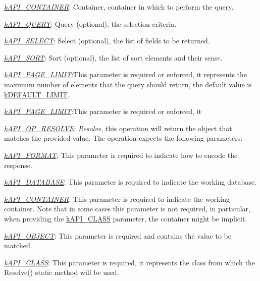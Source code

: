 \begin{DoxyItemize}
\begin{DoxyItemize}
\begin{DoxyItemize}
\item {\itshape \hyperlink{}{k\-A\-P\-I\-\_\-\-C\-O\-N\-T\-A\-I\-N\-E\-R}}\-: Container, container in which to perform the query. 
\item {\itshape \hyperlink{}{k\-A\-P\-I\-\_\-\-Q\-U\-E\-R\-Y}}\-: Query (optional), the selection criteria. 
\item {\itshape \hyperlink{}{k\-A\-P\-I\-\_\-\-S\-E\-L\-E\-C\-T}}\-: Select (optional), the list of fields to be returned. 
\item {\itshape \hyperlink{}{k\-A\-P\-I\-\_\-\-S\-O\-R\-T}}\-: Sort (optional), the list of sort elements and their sense. 
\item {\itshape \hyperlink{}{k\-A\-P\-I\-\_\-\-P\-A\-G\-E\-\_\-\-L\-I\-M\-I\-T}}\-:This parameter is required or enforced, it represents the maximum number of elements that the query should return, the default value is \hyperlink{}{k\-D\-E\-F\-A\-U\-L\-T\-\_\-\-L\-I\-M\-I\-T}. 
\item {\itshape \hyperlink{}{k\-A\-P\-I\-\_\-\-P\-A\-G\-E\-\_\-\-L\-I\-M\-I\-T}}\-:This parameter is required or enforced, it 
\end{DoxyItemize}
\item {\itshape \hyperlink{}{k\-A\-P\-I\-\_\-\-O\-P\-\_\-\-R\-E\-S\-O\-L\-V\-E}}\-: {\itshape Resolve}, this operation will return the object that matches the provided value. The operation expects the following parameters\-: 
\begin{DoxyItemize}
\item {\itshape \hyperlink{}{k\-A\-P\-I\-\_\-\-F\-O\-R\-M\-A\-T}}\-: This parameter is required to indicate how to encode the response. 
\item {\itshape \hyperlink{}{k\-A\-P\-I\-\_\-\-D\-A\-T\-A\-B\-A\-S\-E}}\-: This parameter is required to indicate the working database. 
\item {\itshape \hyperlink{}{k\-A\-P\-I\-\_\-\-C\-O\-N\-T\-A\-I\-N\-E\-R}}\-: This parameter is required to indicate the working container. Note that in some cases this parameter is not required, in particular, when providing the \hyperlink{}{k\-A\-P\-I\-\_\-\-C\-L\-A\-S\-S} parameter, the container might be implicit. 
\item {\itshape \hyperlink{}{k\-A\-P\-I\-\_\-\-O\-B\-J\-E\-C\-T}}\-: This parameter is required and contains the value to be matched. 
\item {\itshape \hyperlink{}{k\-A\-P\-I\-\_\-\-C\-L\-A\-S\-S}}\-: This parameter is required, it represents the class from which the {\ttfamily Resolve()} static method will be used. 

\end{DoxyItemize}
\end{DoxyItemize}
\end{DoxyItemize}
